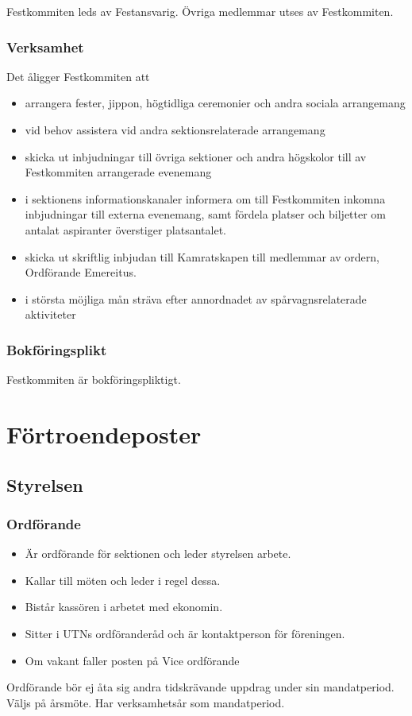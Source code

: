 \documentclass{../resources/dgovdoc}
\begin{document}
Festkommiten leds av Festansvarig. Övriga medlemmar utses av Festkommiten. 

\subsubsection{Verksamhet}

Det åligger Festkommiten att

\begin{itemize}
\item arrangera fester, jippon, högtidliga ceremonier och andra sociala arrangemang
\item vid behov assistera vid andra sektionsrelaterade arrangemang
\item skicka ut inbjudningar till övriga sektioner och andra högskolor till av Festkommiten arrangerade evenemang
\item i sektionens informationskanaler informera om till Festkommiten inkomna inbjudningar till externa evenemang, samt fördela platser och biljetter om antalat aspiranter överstiger platsantalet. 
\item skicka ut skriftlig inbjudan till Kamratskapen till medlemmar av ordern, Ordförande Emereitus. 
\item i största möjliga mån sträva efter annordnadet av spårvagnsrelaterade aktiviteter
\end{itemize}

\subsubsection{Bokföringsplikt}

Festkommiten är bokföringspliktigt. 

\section{Förtroendeposter}

\subsection{Styrelsen}

\subsubsection{Ordförande}

\begin{itemize}
\item Är ordförande för sektionen och leder styrelsen arbete.
\item Kallar till möten och leder i regel dessa.
\item Bistår kassören i arbetet med ekonomin.
\item Sitter i UTNs ordföranderåd och är kontaktperson för föreningen.
\item Om vakant faller posten på Vice ordförande
\end{itemize} 
Ordförande bör ej åta sig andra tidskrävande uppdrag under sin mandatperiod. 
Väljs på årsmöte. Har verksamhetsår som mandatperiod.
\end{document}
